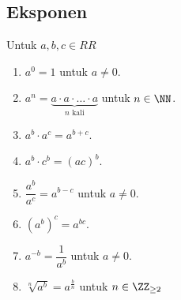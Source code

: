\subsection{Eksponen}
Untuk $a,b,c \in RR$
\begin{enumerate}
    \item $a^0=1$ untuk $a \neq 0$.
    \item $a^n =  \underbrace{a \cdot a \cdot \ldots \cdot a}_{n \text{ kali}}$ untuk $n \in \NN$.
    \item $a^b\cdot a^c=a^{b+c}$.
    \item $a^b\cdot c^b = (ac)^b$.
    \item $\dfrac{a^b}{a^c}=a^{b-c}$ untuk $a\neq 0$.
    \item $(a^b)^c=a^{bc}$.
    \item $a^{-b} = \dfrac{1}{a^b}$ untuk $a \neq 0$.
    \item $\sqrt[n]{a^b}=a^{\frac{b}{n}}$ untuk $n \in \ZZ_{\ge 2}$
\end{enumerate}
